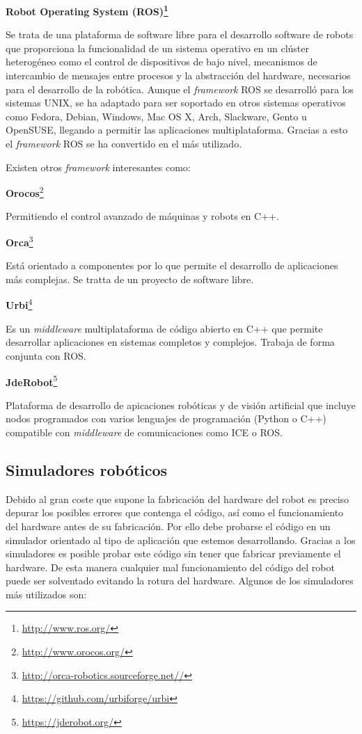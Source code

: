 	\textbf{Robot Operating System (ROS)\footnote{\url{http://www.ros.org/}}}

Se trata de una plataforma de software libre para el desarrollo software de robots que proporciona la funcionalidad de un sistema operativo en un clúster heterogéneo como el control de dispositivos de bajo nivel, mecanismos de intercambio de mensajes entre procesos y la abstracción del hardware, necesarios para el desarrollo de la robótica. Aunque el \textit{framework} ROS se desarrolló para los sistemas UNIX, se ha adaptado para ser soportado en otros sistemas operativos como Fedora, Debian, Windows, Mac OS X, Arch, Slackware, Gento u OpenSUSE, llegando a permitir las aplicaciones multiplataforma. Gracias a esto el \textit{framework} ROS se ha convertido en el más utilizado.

Existen otros \textit{framework} interesantes como:

	\textbf{Orocos}\footnote{\url{http://www.orocos.org/}}

Permitiendo el control avanzado de máquinas y robots en C++.

	\textbf{Orca}\footnote{\url{http://orca-robotics.sourceforge.net//}}

Está orientado a componentes por lo que permite el desarrollo de aplicaciones más complejas. Se tratta de un proyecto de software libre.

	\textbf{Urbi}\footnote{\url{https://github.com/urbiforge/urbi}}

Es un \textit{middleware} multiplataforma de código abierto en C++ que permite desarrollar aplicaciones en sistemas completos y complejos. Trabaja de forma conjunta con ROS.

	\textbf{JdeRobot}\footnote{\url{https://jderobot.org/}}

Plataforma de desarrollo de apicaciones robóticas y de visión artificial que incluye nodos programados con varios lenguajes de programación (Python o C++) compatible con \textit{middleware} de comunicaciones como ICE o ROS.

\subsection{Simuladores robóticos}
Debido al gran coste que supone la fabricación del hardware del robot es preciso depurar los posibles errores que contenga el código, así como el funcionamiento del hardware antes de su fabricación. Por ello debe probarse el código en un simulador orientado al tipo de aplicación que estemos desarrollando. Gracias a los simuladores es posible probar este código sin tener que fabricar previamente el hardware. De esta manera cualquier mal funcionamiento del código del robot puede ser solventado evitando la rotura del hardware. Algunos de los simuladores más utilizados son:

